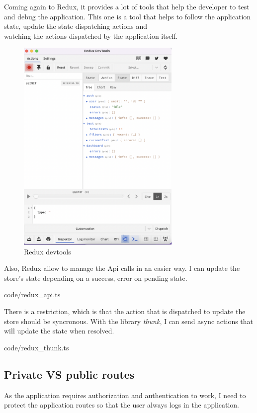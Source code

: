     Coming again to Redux, it provides a lot of tools that help the developer to test and debug the application. This one is a tool that helps to follow the application state, update the state dispatching actions and \\
    watching the actions dispatched by the application itself.
    \begin{figure}[H]
        \centering
            \includegraphics[width=0.7\textwidth]{assets/redux_devtools.png}
        \caption{Redux devtools}
        \label{fig:Redux devtools}
    \end{figure}

    Also, Redux allow to manage the Api calls in an easier way. I can update the store's state depending on a success, error on pending state.
    
    {code/redux_api.ts}

    There is a restriction, which is that the action that is dispatched to update the store should be syncronous. With the library \textit{thunk}, I can send async actions that will update the state when resolved.
    
    {code/redux_thunk.ts}

    \subsection{Private VS public routes}
    As the application requires authorization and authentication to work, I need to protect the application routes so that the user always logs in the application. \\

